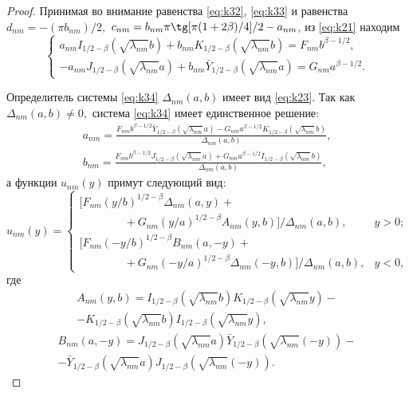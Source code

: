 \begin{proof}
\newpage

Принимая во внимание равенства \eqref{eq:k32}, \eqref{eq:k33} и равенства $d_{nm}=-(\pi b_{nm})/2,$ $c_{nm}=b_{nm}\pi\tg[\pi(1+2\beta)/4]/2-a_{nm}$,  из \eqref{eq:k21} находим
\begin{equation}
\left\{ 
\begin{array}{r}
a_{nm}I_{ 1/2 -\beta}(\sqrt{\lambda_{nm}}b)+b_{nm}K_{ 1/2 -\beta}(\sqrt{\lambda_{nm}}b)=F_{nm}b^{\beta- 1/2 } ,~ \!\!
\\[2mm]
-a_{nm}J_{ 1/2 -\beta}(\sqrt{\lambda_{nm}}a)+b_{nm}\bar Y_{ 1/2 -\beta}(\sqrt{\lambda_{nm}}a)=G_{nm}a^{\beta- 1/2 }.
\end{array} \right.
\label{eq:k34}
\end{equation}



	Определитель системы \eqref{eq:k34} $\Delta_{nm}(a,b)$ имеет вид \eqref{eq:k23}. 
	Так как ${\Delta_{nm}(a,b)\ne0,}$ система \eqref{eq:k34} имеет единственное решение:
\begin{gather*}
a_{nm}=\frac{F_{nm}b^{\beta- 1/2 }\bar Y_{ 1/2 -\beta}(\sqrt{\lambda_{nm}}a)-G_{nm}a^{\beta- 1/2 }K_{ 1/2 -\beta}(\sqrt{\lambda_{nm}}b)}{\Delta_{nm}(a,b)},
\\
b_{nm}=\frac{F_{nm}b^{\beta- 1/2 }J_{ 1/2 -\beta}(\sqrt{\lambda_{nm}}a)+G_{nm}a^{\beta- 1/2 }I_{ 1/2 -\beta}(\sqrt{\lambda_{nm}}b)}{\Delta_{nm}(a,b)},
\end{gather*}
а функции $u_{nm}(y)$ примут следующий вид:
\begin{equation}
u_{nm}(y)=\left\{
\begin{array}{ll}
[F_{nm}(y/b)^{ 1/2 -\beta}\Delta_{nm}(a,y)+ &
\\
\qquad \qquad  +G_{nm}(y/a)^{ 1/2 -\beta}A_{nm}(y,b)]/\Delta_{nm}(a,b), &y>0;  
\\[2mm]
[ F_{nm}(-y/b)^{ 1/2 -\beta}B_{nm}(a,-y)+ &
\\
\qquad \qquad  +G_{nm}(-y/a)^{ 1/2 -\beta} \Delta_{nm} (-y,b)]  / \Delta_{nm} (a,b), & y<0,
\end{array} \right.
\label{eq:k35}
\end{equation}
где
\begin{multline*}
A_{nm}(y,b)=I_{ 1/2 -\beta}(\sqrt{\lambda_{nm}}b)K_{ 1/2 -\beta}(\sqrt{\lambda_{nm}}y)-
\\
-K_{ 1/2 -\beta}(\sqrt{\lambda_{nm}}b)I_{ 1/2 -\beta}(\sqrt{\lambda_{nm}}y),
\end{multline*}
\begin{multline*}
B_{nm}(a,-y)=J_{ 1/2 -\beta}(\sqrt{\lambda_{nm}}a)\bar Y_{ 1/2 -\beta}(\sqrt{\lambda_{nm}}(-y))-
\\
-\bar Y_{ 1/2 -\beta}(\sqrt{\lambda_{nm}}a)J_{ 1/2 -\beta}(\sqrt{\lambda_{nm}}(-y)).
\end{multline*}


\end{proof}
